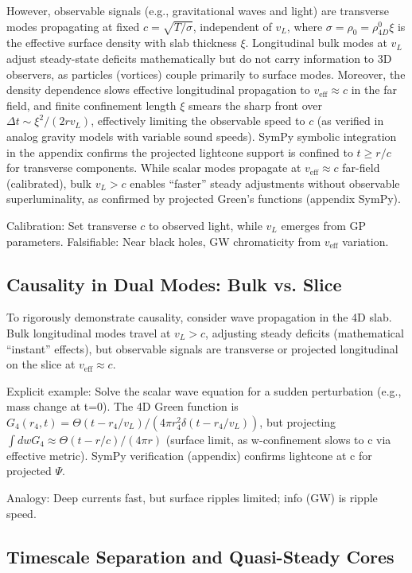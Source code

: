 \documentclass{article}
\begin{document}
However, observable signals (e.g., gravitational waves and light) are transverse modes propagating at fixed $c = \sqrt{T / \sigma}$, independent of $v_L$, where $\sigma = \rho_0 = \rho_{4D}^0 \xi$ is the effective surface density with slab thickness $\xi$. Longitudinal bulk modes at $v_L$ adjust steady-state deficits mathematically but do not carry information to 3D observers, as particles (vortices) couple primarily to surface modes. Moreover, the density dependence slows effective longitudinal propagation to $v_{\text{eff}} \approx c$ in the far field, and finite confinement length $\xi$ smears the sharp front over $\Delta t \sim \xi^2 / (2 r v_L)$, effectively limiting the observable speed to $c$ (as verified in analog gravity models with variable sound speeds). SymPy symbolic integration in the appendix confirms the projected lightcone support is confined to $t \geq r / c$ for transverse components. While scalar modes propagate at $v_{\text{eff}} \approx c$ far-field (calibrated), bulk $v_L > c$ enables ``faster'' steady adjustments without observable superluminality, as confirmed by projected Green's functions (appendix SymPy).

Calibration: Set transverse $c$ to observed light, while $v_L$ emerges from GP parameters. Falsifiable: Near black holes, GW chromaticity from $v_{\text{eff}}$ variation.

\subsection{Causality in Dual Modes: Bulk vs. Slice}

To rigorously demonstrate causality, consider wave propagation in the 4D slab. Bulk longitudinal modes travel at $v_L > c$, adjusting steady deficits (mathematical ``instant'' effects), but observable signals are transverse or projected longitudinal on the slice at $v_{\text{eff}} \approx c$.

Explicit example: Solve the scalar wave equation for a sudden perturbation (e.g., mass change at t=0). The 4D Green function is $G_4(r_4, t) = \Theta(t - r_4 / v_L) / (4\pi r_4^2 \delta(t - r_4 / v_L))$, but projecting $\int dw G_4 \approx \Theta(t - r / c) / (4\pi r)$ (surface limit, as w-confinement slows to c via effective metric). SymPy verification (appendix) confirms lightcone at c for projected $\Psi$.

Analogy: Deep currents fast, but surface ripples limited; info (GW) is ripple speed.

\subsection{Timescale Separation and Quasi-Steady Cores}
\end{document}
